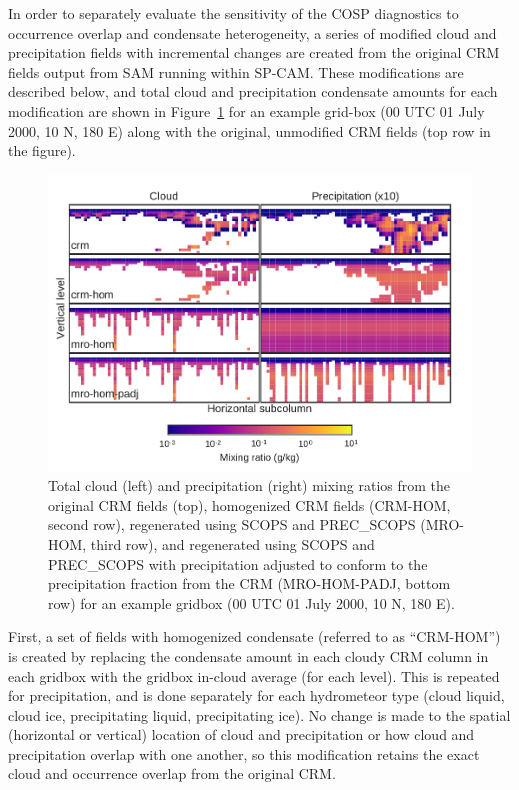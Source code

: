 In order to separately evaluate the sensitivity of the COSP diagnostics
to occurrence overlap and condensate heterogeneity, a series of modified
cloud and precipitation fields with incremental changes are created from
the original CRM fields output from SAM running within SP-CAM. These
modifications are described below, and total cloud and precipitation
condensate amounts for each modification are shown in
Figure~\ref{fig:mxratioExampleMro} for an example grid-box (00 UTC 01
July 2000, 10 N, 180 E) along with the original, unmodified CRM fields
(top row in the figure).

\begin{figure}[htbp]
\centering
\includegraphics{graphics/subgrid1_mxratio_example.pdf}
\caption{\label{fig:mxratioExampleMro}Total cloud (left) and
precipitation (right) mixing ratios from the original CRM fields (top),
homogenized CRM fields (CRM-HOM, second row), regenerated using SCOPS
and PREC\_SCOPS (MRO-HOM, third row), and regenerated using SCOPS and
PREC\_SCOPS with precipitation adjusted to conform to the precipitation
fraction from the CRM (MRO-HOM-PADJ, bottom row) for an example gridbox
(00 UTC 01 July 2000, 10 N, 180 E).}\label{fig:mxratioExampleMro}
\end{figure}

First, a set of fields with homogenized condensate (referred to as
``CRM-HOM'') is created by replacing the condensate amount in each
cloudy CRM column in each gridbox with the gridbox in-cloud average (for
each level). This is repeated for precipitation, and is done separately
for each hydrometeor type (cloud liquid, cloud ice, precipitating
liquid, precipitating ice). No change is made to the spatial (horizontal
or vertical) location of cloud and precipitation or how cloud and
precipitation overlap with one another, so this modification retains the
exact cloud and occurrence overlap from the original CRM.

